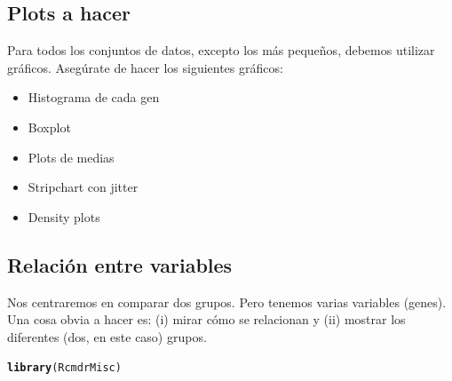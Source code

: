 \documentclass{config/apuntes}\usepackage[]{graphicx}\usepackage[]{xcolor}
\makeatletter
\newcommand{\hldef}[1]{\textcolor[rgb]{0.345,0.345,0.345}{#1}}%
\newcommand{\hlkwd}[1]{\textcolor[rgb]{0.737,0.353,0.396}{\textbf{#1}}}%
\newenvironment{kframe}{%
 \def\at@end@of@kframe{}%
 \ifinner\ifhmode%
  \def\at@end@of@kframe{\end{minipage}}%
  \begin{minipage}{\columnwidth}%
 \fi\fi%
 \def\FrameCommand##1{\hskip\@totalleftmargin \hskip-\fboxsep
 \colorbox{shadecolor}{##1}\hskip-\fboxsep
     \hskip-\linewidth \hskip-\@totalleftmargin \hskip\columnwidth}%
 \MakeFramed {\advance\hsize-\width
   \@totalleftmargin\z@ \linewidth\hsize
   \@setminipage}}%
 {\par\unskip\endMakeFramed%
 \at@end@of@kframe}
\newenvironment{knitrout}{}{} %
\makeatother
\begin{document}
\subsection{Plots a hacer}
Para todos los conjuntos de datos, excepto los más pequeños, debemos utilizar gráficos. Asegúrate de hacer los siguientes gráficos:
\begin{itemize}
\item Histograma de cada gen
\item Boxplot
\item Plots de medias
\item Stripchart con jitter
\item Density plots
\end{itemize}

\subsection{Relación entre variables}
Nos centraremos en comparar dos grupos. Pero tenemos varias variables (genes). Una cosa obvia a hacer es: (i) mirar cómo se relacionan y (ii) mostrar los diferentes (dos, en este caso) grupos.
\begin{knitrout}
\color{fgcolor}\begin{kframe}
\begin{alltt}
\hlkwd{library}\hldef{(RcmdrMisc)}
\end{alltt}


{\ttfamily\noindent\itshape\color{messagecolor}{\#\# Cargando paquete requerido: sandwich}}\end{kframe}
\end{knitrout}
\end{document}
